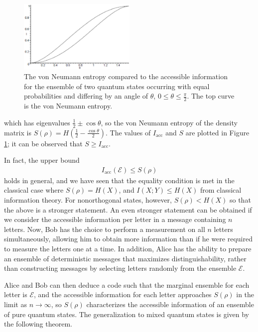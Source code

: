 \documentclass[a4paper, 12pt]{article}
\numberwithin{equation}{section}
\numberwithin{figure}{section}
\theoremstyle{definition}
\begin{document}
    \begin{figure}
        \centering
            \includegraphics[width=0.5\textwidth]{accessible_information.eps}
            \caption{The von Neumann entropy compared to the accessible information for the ensemble of two quantum states occurring with equal probabilities and differing by an angle of $\theta$, $0 \leq \theta \leq \frac{\pi}{2}$. The top curve is the von Neumann entropy. \cite{shor} \label{fig:accessible}}
    \end{figure}
    which has eigenvalues $\frac{1}{2} \pm \cos\theta$, so the von Neumann entropy of the density matrix is $S(\rho) = H \left( \frac{1}{2} - \frac{\cos\theta}{2} \right)$. The values of $I_{\text{acc}}$ and $S$ are plotted in Figure \ref{fig:accessible}; it can be observed that $S \geq I_{\text{acc}}$. \par
    In fact, the upper bound
    \begin{align}
        I_{\text{acc}}(\mathcal{E}) \leq S(\rho)
    \end{align}
    holds in general, and we have seen that the equality condition is met in the classical case where $S(\rho) = H(X)$, and $I(X; Y) \leq H(X)$ from classical information theory. For nonorthogonal states, however, $S(\rho) < H(X)$ so that the above is a stronger statement.
    An even stronger statement can be obtained if we consider the accessible information per letter in a message containing $n$ letters. Now, Bob has the choice to perform a measurement on all $n$ letters simultaneously, allowing him to obtain more information than if he were required to measure the letters one at a time. In addition, Alice has the ability to prepare an ensemble of deterministic messages that maximizes distinguishability, rather than constructing messages by selecting letters randomly from the ensemble $\mathcal{E}$. \par
    Alice and Bob can then deduce a code such that the marginal ensemble for each letter is $\mathcal{E}$, and the accessible information for each letter approaches $S(\rho)$ in the limit as $n \to \infty$, so $S(\rho)$ characterizes the accessible information of an ensemble of pure quantum states. The generalization to mixed quantum states is given by the following theorem.
\end{document}
